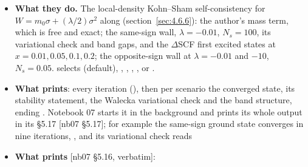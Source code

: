 \begin{itemize}
  \item \textbf{What they do.} The local-density Kohn--Sham self-consistency for $W = m_0 \sigma + (\lambda/2) \sigma^{2}$ along  (section~\ref{sec:4.6.6}): \cftt{[DFT-{}a]} the author's mass term, which is free and exact; \cftt{[DFT-{}b]} the same-sign wall, $\lambda = -0.01$, $N_s = 100$, its variational check and band gaps, and the $\Delta$SCF first excited states at $x = 0.01, 0.05, 0.1, 0.2$; \cftt{[DFT-{}c]} the opposite-sign wall at $\lambda = -0.01$ and $-10$, $N_s = 0.05$.  selects  (default), , , , ,  or .
  \item \textbf{What  prints}: every iteration (), then per scenario the converged state, its stability statement, the Walecka variational check and the band structure, ending \cftt{[done in 522.4 s]}. Notebook 07 starts it in the background and prints its whole output in its \S{}5.17 [nb07 \S{}5.17]; for example the same-sign ground state converges in nine iterations, , and its variational check reads 
  \item \textbf{What  prints} [nb07 \S{}5.16, verbatim]:
\end{itemize}

